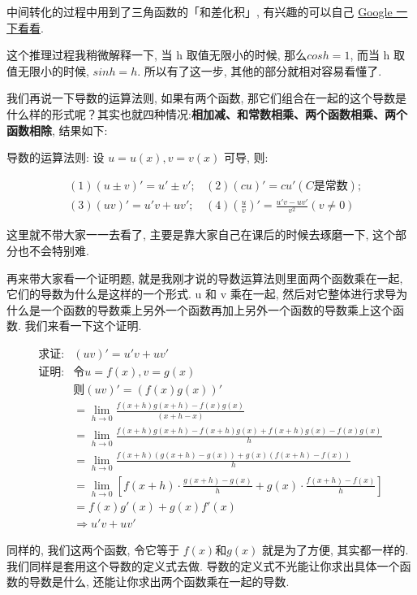 中间转化的过程中用到了三角函数的「和差化积」, 有兴趣的可以自己 \href{https://www.google.com/search?q=%E5%92%8C%E5%B7%AE%E5%8C%96%E7%A7%AF&sourceid=chrome&ie=UTF-8}{Google 一下看看}. 

这个推理过程我稍微解释一下, 当 h 取值无限小的时候, 那么$cosh=1$,  而当 h 取值无限小的时候, $sinh=h$. 所以有了这一步, 其他的部分就相对容易看懂了. 

我们再说一下导数的运算法则, 如果有两个函数, 那它们组合在一起的这个导数是什么样的形式呢？其实也就四种情况:\textbf{相加减、和常数相乘、两个函数相乘、两个函数相除}, 结果如下: 

导数的运算法则: 设 $u=u(x), v=v(x)$ 可导, 则:

\begin{align*}
  & (1) (u\pm v)'=u'\pm v'; &(2) (cu)'=cu' (C\mbox{是常数}); \\
  & (3) (uv)'=u'v+uv'; &(4) (\frac{u}{v})'=\frac{u'v-uv'}{v^2}(v \ne 0)
\end{align*}

这里就不带大家一一去看了, 主要是靠大家自己在课后的时候去琢磨一下, 这个部分也不会特别难. 

再来带大家看一个证明题, 就是我刚才说的导数运算法则里面两个函数乘在一起, 它们的导数为什么是这样的一个形式. u 和 v 乘在一起, 然后对它整体进行求导为什么是一个函数的导数乘上另外一个函数再加上另外一个函数的导数乘上这个函数. 我们来看一下这个证明. 


\begin{align*}
  \mbox{求证:} &  (uv)'=u'v + uv' \\
  \mbox{证明:} & \mbox{令} u = f(x), v = g(x) \\
  & \mbox{则} (uv)' = (f(x)g(x))' \\ 
  & = \lim_{h\to 0}\frac{f(x+h)g(x+h) - f(x)g(x)}{(x+h - x)} \\
  & =\lim_{h\to0}\frac{f(x+h)g(x+h)-f(x+h)g(x)+f(x+h)g(x)-f(x)g(x)}{h} \\
  & =\lim_{h\to0}\frac{f(x+h)(g(x+h)-g(x)) +g(x)(f(x+h)-f(x))}{h} \\
  & =\lim_{h\to0}\left[f(x+h) \cdot \frac{g(x+h)-g(x)}{h} + g(x)\cdot \frac{f(x+h)-f(x)}{h} \right] \\
  & =f(x)g'(x) + g(x)f'(x) \\
  & \Rightarrow u'v + uv'
\end{align*}


同样的, 我们这两个函数, 令它等于 $f(x)$和$g(x)$ 就是为了方便, 其实都一样的. 我们同样是套用这个导数的定义式去做. 导数的定义式不光能让你求出具体一个函数的导数是什么, 还能让你求出两个函数乘在一起的导数. 

